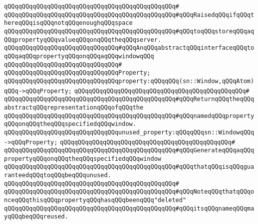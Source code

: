 \verb|qQQqqQQqqQQqqQQqqQQqqQQqqQQqqQQqqQQqqQQqqQQqqQQq#|\newline
\verb|qQQqqQQqqQQqqQQqqQQqqQQqqQQqqQQqqQQqqQQqqQQqqQQq#qQQqRaisedqQQqifqQQqthereqQQqisqQQqnotqQQqenoughqQQqspace|\newline
\verb|qQQqqQQqqQQqqQQqqQQqqQQqqQQqqQQqqQQqqQQqqQQqqQQq#qQQqtoqQQqstoreqQQqaqQQqpropertyqQQqvalueqQQqonqQQqtheqQQqserver.|\newline
\newline
\newline
\verb|qQQqqQQqqQQqqQQqqQQqqQQqqQQqqQQq#qQQqAnqQQqabstractqQQqinterfaceqQQqtoqQQqaqQQqpropertyqQQqonqQQqaqQQqwindowqQQq|\newline
\verb|qQQqqQQqqQQqqQQqqQQqqQQqqQQqqQQq#|\newline
\verb|qQQqqQQqqQQqqQQqqQQqqQQqqQQqqQQqProperty;|\newline
\newline
\verb|qQQqqQQqqQQqqQQqqQQqqQQqqQQqqQQqproperty:qQQqqQQq(sn::Window,qQQqAtom)qQQq->qQQqProperty;|\newline
\verb|qQQqqQQqqQQqqQQqqQQqqQQqqQQqqQQqqQQqqQQqqQQqqQQq#|\newline
\verb|qQQqqQQqqQQqqQQqqQQqqQQqqQQqqQQqqQQqqQQqqQQqqQQq#qQQqReturnqQQqtheqQQqabstractqQQqrepresentationqQQqofqQQqthe|\newline
\verb|qQQqqQQqqQQqqQQqqQQqqQQqqQQqqQQqqQQqqQQqqQQqqQQq#qQQqnamedqQQqpropertyqQQqonqQQqtheqQQqspecifiedqQQqwindow.|\newline
\newline
\newline
\verb|qQQqqQQqqQQqqQQqqQQqqQQqqQQqqQQqunused_property:qQQqqQQqsn::WindowqQQq->qQQqProperty;|\newline
\verb|qQQqqQQqqQQqqQQqqQQqqQQqqQQqqQQqqQQqqQQqqQQqqQQq#|\newline
\verb|qQQqqQQqqQQqqQQqqQQqqQQqqQQqqQQqqQQqqQQqqQQqqQQq#qQQqGenerateqQQqaqQQqpropertyqQQqonqQQqtheqQQqspecifiedqQQqwindow|\newline
\verb|qQQqqQQqqQQqqQQqqQQqqQQqqQQqqQQqqQQqqQQqqQQqqQQq#qQQqthatqQQqisqQQqguaranteedqQQqtoqQQqbeqQQqunused.|\newline
\verb|qQQqqQQqqQQqqQQqqQQqqQQqqQQqqQQqqQQqqQQqqQQqqQQq#|\newline
\verb|qQQqqQQqqQQqqQQqqQQqqQQqqQQqqQQqqQQqqQQqqQQqqQQq#qQQqNoteqQQqthatqQQqonceqQQqthisqQQqpropertyqQQqhasqQQqbeenqQQq"deleted"|\newline
\verb|qQQqqQQqqQQqqQQqqQQqqQQqqQQqqQQqqQQqqQQqqQQqqQQq#qQQqitsqQQqnameqQQqmayqQQqbeqQQqreused.|\newline
